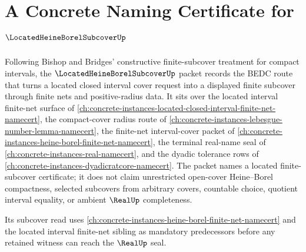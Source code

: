 \chapter{A Concrete Naming Certificate for $\LocatedHeineBorelSubcoverUp$}
\label{ch:concrete-instances-located-heine-borel-subcover-namecert}

Following Bishop and Bridges' constructive finite-subcover treatment for compact intervals, the $\LocatedHeineBorelSubcoverUp$ packet records the BEDC route that turns a located closed interval cover request into a displayed finite subcover through finite nets and positive-radius data. It sits over the located interval finite-net surface of \autoref{ch:concrete-instances-located-closed-interval-finite-net-namecert}, the compact-cover radius route of \autoref{ch:concrete-instances-lebesgue-number-lemma-namecert}, the finite-net interval-cover packet of \autoref{ch:concrete-instances-heine-borel-finite-net-namecert}, the terminal real-name seal of \autoref{ch:concrete-instances-real-namecert}, and the dyadic tolerance rows of \autoref{ch:concrete-instances-dyadicratcore-namecert}. The packet names a located finite-subcover certificate; it does not claim unrestricted open-cover Heine--Borel compactness, selected subcovers from arbitrary covers, countable choice, quotient interval equality, or ambient $\RealUp$ completeness.

Its subcover read uses \autoref{ch:concrete-instances-heine-borel-finite-net-namecert} and the located interval finite-net sibling as mandatory predecessors before any retained witness can reach the $\RealUp$ seal.

